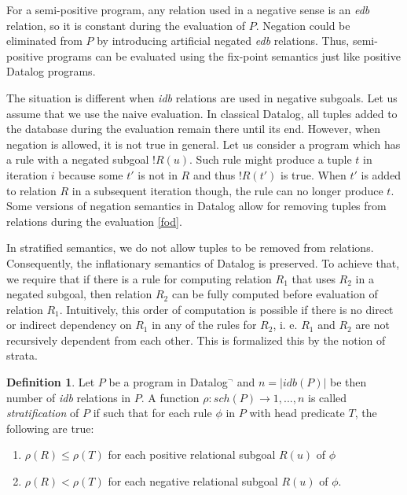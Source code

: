 \documentclass{pracamgr}
\theoremstyle{plain}
\theoremstyle{definition}
\newtheorem{defn}{Definition}[section]
\theoremstyle{remark}
\newcommand{\datalogneg}{Datalog$^{\neg}$ }
\begin{document}
For a semi-positive program, any relation used in a negative sense is an \emph{edb} relation, so it is constant during the evaluation of $P$. Negation could be eliminated from $P$ by introducing artificial negated \emph{edb} relations. Thus, semi-positive programs can be evaluated using the fix-point semantics just like positive Datalog programs.

The situation is different when \emph{idb} relations are used in negative subgoals. Let us assume that we use the naive evaluation. In classical Datalog, all tuples added to the database during the evaluation remain there until its end. However, when negation is allowed, it is not true in general. Let us consider a program which has a rule with a negated subgoal $!R(u)$. Such rule might produce a tuple $t$ in iteration $i$ because some $t'$ is not in $R$ and thus $!R(t')$ is true. When $t'$ is added to relation $R$ in a subsequent iteration though, the rule can no longer produce $t$. Some versions of negation semantics in Datalog allow for removing tuples from relations during the evaluation \ref{fod}.

In stratified semantics, we do not allow tuples to be removed from relations. Consequently, the inflationary semantics of Datalog is preserved. To achieve that, we require that if there is a rule for computing relation $R_1$ that uses $R_2$ in a negated subgoal, then relation $R_2$ can be fully computed before evaluation of relation $R_1$. Intuitively, this order of computation is possible if there is no direct or indirect dependency on $R_1$ in any of the rules for $R_2$, i. e. $R_1$ and $R_2$ are not recursively dependent from each other. This is formalized this by the notion of strata.

\begin{defn}
Let $P$ be a program in \datalogneg and $n = |idb(P)|$ be then number of \emph{idb} relations in $P$. A function $\rho : sch(P) \to {1, . . . , n}$ is called \emph{stratification} of $P$ if such that for each rule $\phi$ in $P$ with head predicate $T$, the following are true: 

\begin{enumerate}
\item $\rho(R) \le \rho(T)$ for each positive relational subgoal $R(u)$ of $\phi$
\item $\rho(R) < \rho(T)$ for each negative relational subgoal $R(u)$ of $\phi$.
\end{enumerate}
\end{defn}
\end{document}
